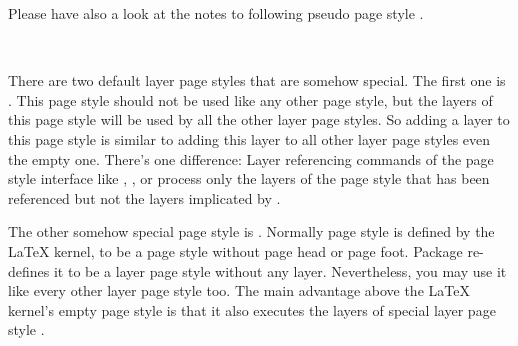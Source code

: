 Please have also a look at the notes to following pseudo page style
.%
%
%
%
%

\begin{Declaration}
  \\
\end{Declaration}
%
%
There are two default layer page styles that are somehow special. The first
one is . This page style should not be used like any
other page style, but the layers of this page style will be used by all the
other layer page styles. So adding a layer to this page style is similar to
adding this layer to all other layer page styles even the empty one. There's
one difference: Layer referencing commands of the page style interface like
, , or
 process only the layers of the page
style that has been referenced but not the layers implicated by
.

The other somehow special page style is . Normally page style
 is defined by the \LaTeX{} kernel, to be a page style
without page head or page foot. Package  re-defines it to be
a layer page style without any layer. Nevertheless, you may use it like every
other layer page style too. The main advantage above the \LaTeX{} kernel's
empty page style is that it also executes the layers of special layer page
style .%
%
%

